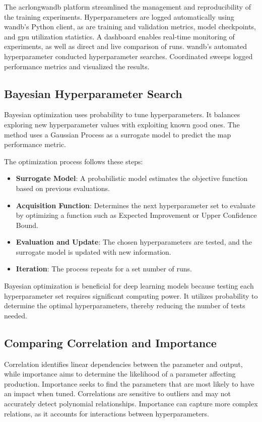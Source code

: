 The acrlong{wandb} platform streamlined the management and reproducibility of the training experiments. Hyperparameters are logged automatically using \acrshort{wandb}'s Python client, as are training and validation metrics, model checkpoints, and \acrshort{gpu} utilization statistics. A dashboard enables real-time monitoring of experiments, as well as direct and live comparison of runs. \acrshort{wandb}'s automated hyperparameter conducted hyperparameter searches. Coordinated sweeps logged performance metrics and visualized the results. 

\subsection{Bayesian Hyperparameter Search}

Bayesian optimization uses probability to tune hyperparameters. It balances exploring new hyperparameter values with exploiting known good ones. The method uses a Gaussian Process as a surrogate model to predict the \acrlong{map} performance metric.

The optimization process follows these steps:
\begin{itemize}
    \item \textbf{Surrogate Model}: A probabilistic model estimates the objective function based on previous evaluations.
    \item \textbf{Acquisition Function}: Determines the next hyperparameter set to evaluate by optimizing a function such as Expected Improvement or Upper Confidence Bound.
    \item \textbf{Evaluation and Update}: The chosen hyperparameters are tested, and the surrogate model is updated with new information.
    \item \textbf{Iteration}: The process repeats for a set number of runs.
\end{itemize}

Bayesian optimization is beneficial for deep learning models because testing each hyperparameter set requires significant computing power. It utilizes probability to determine the optimal hyperparameters, thereby reducing the number of tests needed.


\subsection{Comparing Correlation and Importance}


Correlation identifies linear dependencies between the parameter and output, while importance aims to determine the likelihood of a parameter affecting production. Importance seeks to find the parameters that are most likely to have an impact when tuned. Correlations are sensitive to outliers and may not accurately detect polynomial relationships. Importance can capture more complex relations, as it accounts for interactions between hyperparameters. 

